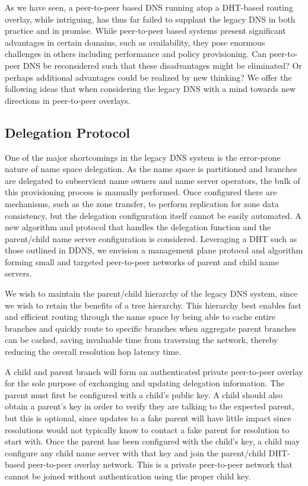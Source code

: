 \documentclass[sigconf]{acmart}
\begin{document}
As we have seen, a peer-to-peer based DNS running atop a DHT-based
routing overlay, while intriguing, has thus far failed to supplant the
legacy DNS in both practice and in promise.  While peer-to-peer based
systems present significant advantages in certain domains, such as
availability, they pose enormous challenges in others including
performance and policy provisioning.  Can peer-to-peer DNS be
reconsidered such that these disadvantages might be eliminated?  Or
perhaps additional advantages could be realized by new thinking?  We
offer the following ideas that when considering the legacy DNS with a
mind towards new directions in peer-to-peer overlays.

\subsection{Delegation Protocol}

One of the major shortcomings in the legacy DNS system is the
error-prone nature of name space delegation.  As the name space is
partitioned and branches are delegated to subservient name owners and
name server operators, the bulk of this provisioning process is manually
performed.  Once configured there are mechanisms, such as the zone
transfer, to perform replication for zone data consistency, but the
delegation configuration itself cannot be easily automated.  A new
algorithm and protocol that handles the delegation function and the
parent/child name server configuration is considered.  Leveraging a DHT
such as those outlined in DDNS, we envision a management plane protocol
and algorithm forming small and targeted peer-to-peer networks of parent
and child name servers.

We wish to maintain the parent/child hierarchy of the legacy DNS system,
since we wish to retain the benefits of a tree hierarchy.  This
hierarchy best enables fast and efficient routing through the name space
by being able to cache entire branches and quickly route to specific
branches when aggregate parent branches can be cached, saving
invaluable time from traversing the network, thereby reducing the
overall resolution hop latency time.

A child and parent branch will form an authenticated private
peer-to-peer overlay for the sole purpose of exchanging and updating
delegation information.  The parent must first be configured with a
child's public key.  A child should also obtain a parent's key in order
to verify they are talking to the expected parent, but this is optional,
since updates to a fake parent will have little impact since resolutions
would not typically know to contact a fake parent for resolution to
start with.  Once the parent has been configured with the child's key, a
child may configure any child name server with that key and join the
parent/child DHT-based peer-to-peer overlay network.  This is a private
peer-to-peer network that cannot be joined without authentication using
the proper child key.
\end{document}
